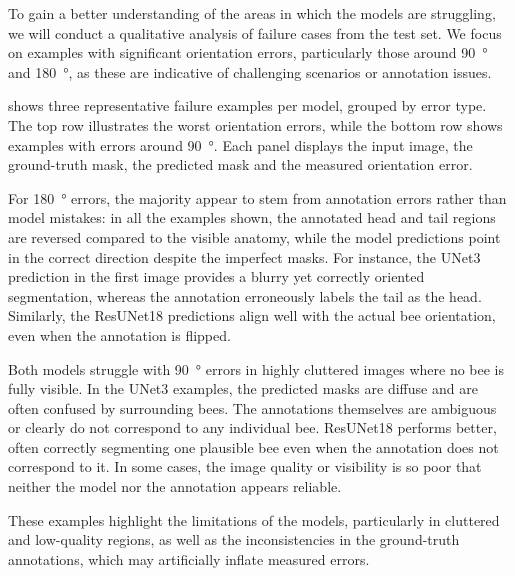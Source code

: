 To gain a better understanding of the areas in which the models are struggling, we will conduct a qualitative analysis of failure cases from the test set.
We focus on examples with significant orientation errors, particularly those around \qty{90}{\degree} and \qty{180}{\degree}, as these are indicative of challenging scenarios or annotation issues.

 shows three representative failure examples per model, grouped by error type.
The top row illustrates the worst orientation errors, while the bottom row shows examples with errors around \qty{90}{\degree}.
Each panel displays the input image, the ground-truth mask, the predicted mask and the measured orientation error.

For \qty{180}{\degree} errors, the majority appear to stem from annotation errors rather than model mistakes: in all the examples shown, the annotated head and tail regions are reversed compared to the visible anatomy, while the model predictions point in the correct direction despite the imperfect masks.
For instance, the UNet3 prediction in the first image provides a blurry yet correctly oriented segmentation, whereas the annotation erroneously labels the tail as the head.
Similarly, the ResUNet18 predictions align well with the actual bee orientation, even when the annotation is flipped.

Both models struggle with \qty{90}{\degree} errors in highly cluttered images where no bee is fully visible.
In the UNet3 examples, the predicted masks are diffuse and are often confused by surrounding bees.
The annotations themselves are ambiguous or clearly do not correspond to any individual bee.
ResUNet18 performs better, often correctly segmenting one plausible bee even when the annotation does not correspond to it.
In some cases, the image quality or visibility is so poor that neither the model nor the annotation appears reliable.

These examples highlight the limitations of the models, particularly in cluttered and low-quality regions, as well as the inconsistencies in the ground-truth annotations, which may artificially inflate measured errors.



